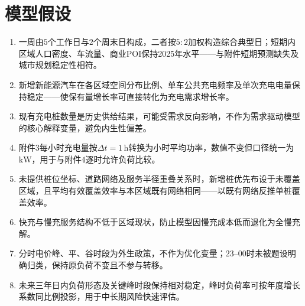 \documentclass[a4paper,12pt]{ctexart}
\begin{document}
\section{模型假设}
\begin{enumerate}[label=\arabic*.]
\item 一周由$5$个工作日与$2$个周末日构成，二者按$5\!:\!2$加权构造综合典型日；短期内区域人口密度、车流量、商业POI保持2025年水平——与附件短期预测缺失及城市规划稳定性相符。
\item 新增新能源汽车在各区域空间分布比例、单车公共充电频率及单次充电电量保持稳定——使保有量增长率可直接转化为充电需求增长率。
\item 现有充电桩数量是历史供给结果，可能受需求反向影响，不作为需求驱动模型的核心解释变量，避免内生性偏差。
\item 附件$3$每小时充电量按$\Delta t=1\,\mathrm{h}$转换为小时平均功率，数值不变但口径统一为$\mathrm{kW}$，用于与附件$4$逐时允许负荷比较。
\item 未提供桩位坐标、道路网络及服务半径重叠关系时，新增桩优先布设于未覆盖区域，且平均有效覆盖效率与本区域既有网络相同——以既有网络反推单桩覆盖效率。
\item 快充与慢充服务结构不低于区域现状，防止模型因慢充成本低而退化为全慢充解。
\item 分时电价峰、平、谷时段为外生政策，不作为优化变量；$23\text{--}00$时未被题设明确归类，保持原负荷不变且不参与转移。
\item 未来三年日内负荷形态及关键峰时段保持相对稳定，峰时负荷率可按年度增长系数同比例投影，用于中长期风险快速评估。
\end{enumerate}

\end{document}
